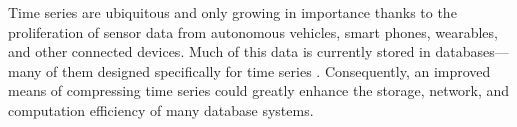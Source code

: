 




Time series are ubiquitous and only growing in importance thanks to the proliferation of sensor data from autonomous vehicles, smart phones, wearables, and other connected devices. Much of this data is currently stored in databases---many of them designed specifically for time series \cite{respawnDB, openTSDB, chronicleDB, kairosDB, druid, influxDB, gorilla}. Consequently, an improved means of compressing time series could greatly enhance the storage, network, and computation efficiency of many database systems.






